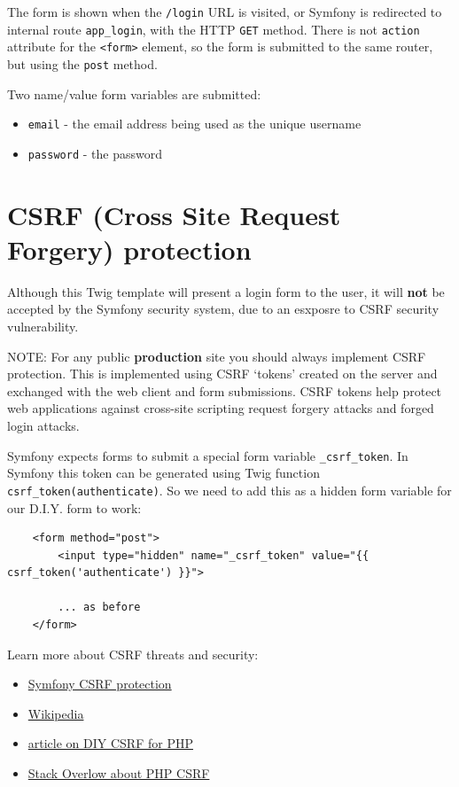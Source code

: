 \documentclass[a4paperpaper,openright]{book}
\begin{document}
The form is shown when the \texttt{/login} URL is visited, or Symfony is
redirected to internal route \texttt{app\_login}, with the HTTP
\texttt{GET} method. There is not \texttt{action} attribute for the
\texttt{\textless{}form\textgreater{}} element, so the form is submitted
to the same router, but using the \texttt{post} method.

Two name/value form variables are submitted:

\begin{itemize}
\item
  \texttt{email} - the email address being used as the unique username
\item
  \texttt{password} - the password
\end{itemize}

\hypertarget{csrf-cross-site-request-forgery-protection}{%
\section{CSRF (Cross Site Request Forgery)
protection}\label{csrf-cross-site-request-forgery-protection}}

Although this Twig template will present a login form to the user, it
will \textbf{not} be accepted by the Symfony security system, due to an
esxposre to CSRF security vulnerability.

NOTE: For any public \textbf{production} site you should always
implement CSRF protection. This is implemented using CSRF `tokens'
created on the server and exchanged with the web client and form
submissions. CSRF tokens help protect web applications against
cross-site scripting request forgery attacks and forged login attacks.

Symfony expects forms to submit a special form variable
\texttt{\_csrf\_token}. In Symfony this token can be generated using
Twig function
\texttt{csrf\_token(\textquotesingle{}authenticate\textquotesingle{})}.
So we need to add this as a hidden form variable for our D.I.Y. form to
work:

\begin{verbatim}
    <form method="post">
        <input type="hidden" name="_csrf_token" value="{{ csrf_token('authenticate') }}">

        ... as before
    </form>
\end{verbatim}

Learn more about CSRF threats and security:

\begin{itemize}
\item
  \href{https://symfony.com/doc/current/security/csrf.html}{Symfony CSRF
  protection}
\item
  \href{https://en.wikipedia.org/wiki/Cross-site_request_forgery\#Forging_login_requests}{Wikipedia}
\item
  \href{https://www.netsparker.com/blog/web-security/protecting-website-using-anti-csrf-token/}{article
  on DIY CSRF for PHP}
\item
  \href{https://stackoverflow.com/questions/6287903/how-to-properly-add-cross-site-request-forgery-csrf-token-using-php}{Stack
  Overlow about PHP CSRF}
\end{itemize}
\end{document}
